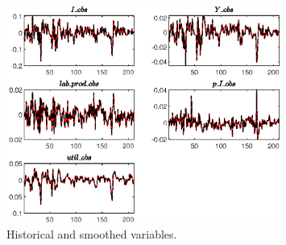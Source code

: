  
\begin{figure}[H]
\centering 
\includegraphics[width=0.80\textwidth]{BRS_imp_mobility_alt/graphs/BRS_imp_mobility_alt_HistoricalAndSmoothedVariables1}
\caption{Historical and smoothed variables.}\label{Fig:HistoricalAndSmoothedVariables:1}
\end{figure}


